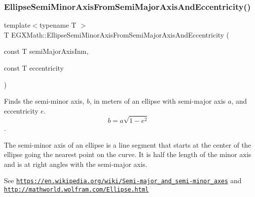 \mbox{\label{group___e_g_x_math-_geometry-2_d-_ellipse-_semi_minor_axis_gad0febd8680a3952ae50ce6ddea584b34}} 
\subsubsection{\texorpdfstring{Ellipse\+Semi\+Minor\+Axis\+From\+Semi\+Major\+Axis\+And\+Eccentricity()}{EllipseSemiMinorAxisFromSemiMajorAxisAndEccentricity()}}
{\footnotesize\ttfamily template$<$typename T $>$ \\
T E\+G\+X\+Math\+::\+Ellipse\+Semi\+Minor\+Axis\+From\+Semi\+Major\+Axis\+And\+Eccentricity (\begin{DoxyParamCaption}\item[{const T}]{semi\+Major\+Axis\+Inm,  }\item[{const T}]{eccentricity }\end{DoxyParamCaption})}



Finds the semi-\/minor axis, $b$, in meters of an ellipse with semi-\/major axis $a$, and eccentricity $e$. \[ b=a \sqrt{1-e^2} \]. 

The semi-\/minor axis of an ellipse is a line segment that starts at the center of the ellipse going the nearest point on the curve. It is half the length of the minor axis and is at right angles with the semi-\/major axis.

See \href{https://en.wikipedia.org/wiki/Semi-major_and_semi-minor_axes}{\tt https\+://en.\+wikipedia.\+org/wiki/\+Semi-\/major\+\_\+and\+\_\+semi-\/minor\+\_\+axes} and \href{http://mathworld.wolfram.com/Ellipse.html}{\tt http\+://mathworld.\+wolfram.\+com/\+Ellipse.\+html}


